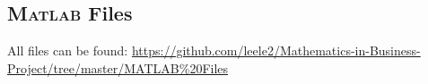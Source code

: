 \begin{appendices}
    \chapter{\textsc{Matlab} Files}
        All files can be found: \small{\url{https://github.com/leele2/Mathematics-in-Business-Project/tree/master/MATLAB%20Files}}
\end{appendices}